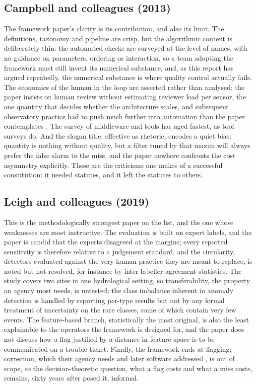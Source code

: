 \subsection{Campbell and colleagues (2013)}

The framework paper's clarity is its contribution, and also its limit. The
definitions, taxonomy and pipeline are crisp, but the algorithmic content is
deliberately thin: the automated checks are surveyed at the level of names,
with no guidance on parameters, ordering or interaction, so a team adopting
the framework must still invent its numerical substance, and, as this report
has argued repeatedly, the numerical substance is where quality control
actually fails. The economics of the human in the loop are asserted rather
than analysed; the paper insists on human review without estimating reviewer
load per sensor, the one quantity that decides whether the architecture
scales, and subsequent observatory practice had to push much further into
automation than the paper contemplates \citep{taylor2013}. The survey of
middleware and tools has aged fastest, as tool surveys do. And the slogan
title, effective as rhetoric, encodes a quiet bias: quantity is nothing
without quality, but a filter tuned by that maxim will always prefer the
false alarm to the miss, and the paper nowhere confronts the cost asymmetry
explicitly. These are the criticisms one makes of a successful constitution:
it needed statutes, and it left the statutes to others.

\subsection{Leigh and colleagues (2019)}

This is the methodologically strongest paper on the list, and the one whose
weaknesses are most instructive. The evaluation is built on expert labels,
and the paper is candid that the experts disagreed at the margins; every
reported sensitivity is therefore relative to a judgement standard, and the
circularity, detectors evaluated against the very human practice they are
meant to replace, is noted but not resolved, for instance by inter-labeller
agreement statistics. The study covers two sites in one hydrological
setting, so transferability, the property an agency most needs, is untested;
the class imbalance inherent in anomaly detection is handled by reporting
per-type results but not by any formal treatment of uncertainty on the rare
classes, some of which contain very few events. The feature-based branch,
statistically the most original, is also the least explainable to the
operators the framework is designed for, and the paper does not discuss how
a flag justified by a distance in feature space is to be communicated on a
trouble ticket. Finally, the framework ends at flagging; correction, which
their agency needs and later software addressed \citep{jones2022}, is out of
scope, so the decision-theoretic question, what a flag costs and what a miss
costs, remains, sixty years after \citet{anscombe1960} posed it, informal.

